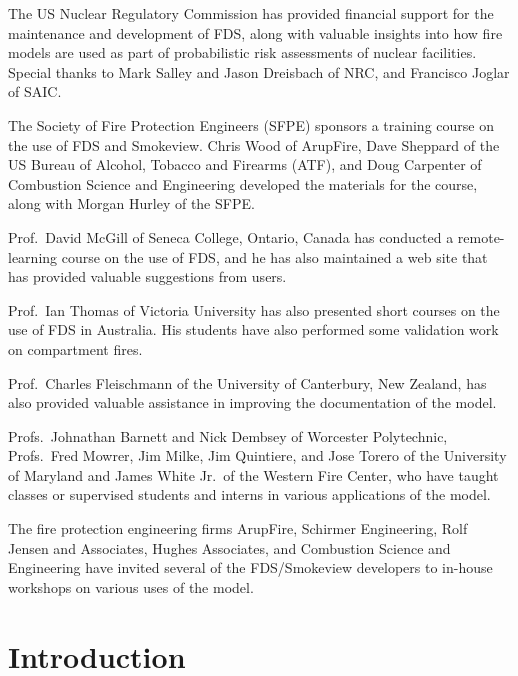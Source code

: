 \documentclass[11pt]{book}
\begin{document}
The US Nuclear Regulatory Commission has provided financial support for the maintenance and development of FDS,
along with valuable insights into how fire models are used as part of probabilistic risk assessments of nuclear
facilities. Special thanks to Mark Salley and Jason Dreisbach of NRC, and Francisco Joglar of SAIC.

The Society of Fire Protection Engineers (SFPE) sponsors a training course on the use of FDS and Smokeview.
Chris Wood of ArupFire, Dave Sheppard of the US Bureau of Alcohol, Tobacco and Firearms (ATF), and
Doug Carpenter of Combustion Science and Engineering developed the materials for the course, along with
Morgan Hurley of the SFPE.

Prof.~David McGill of Seneca College, Ontario, Canada has conducted a remote-learning course
on the use of FDS, and he has also maintained a web site that has provided valuable suggestions from users.

Prof.~Ian Thomas of Victoria University has also presented short courses on the use of FDS in Australia.
His students have also performed some validation work on compartment fires.

Prof.~Charles Fleischmann of the University of Canterbury, New Zealand, has also provided valuable assistance
in improving the documentation of the model.

Profs.~Johnathan Barnett and Nick Dembsey of Worcester Polytechnic, Profs.~Fred Mowrer, Jim Milke, Jim Quintiere,
and Jose Torero of the University of Maryland and James White Jr.~of the Western Fire Center, who have taught
classes or supervised students and interns in various applications of the model.

The fire protection engineering firms ArupFire, Schirmer Engineering, Rolf Jensen and Associates, Hughes Associates,
and Combustion Science and Engineering have invited several of the FDS/Smokeview developers to in-house workshops
on various uses of the model.



\tableofcontents

\mainmatter

\chapter{Introduction}
\end{document}

